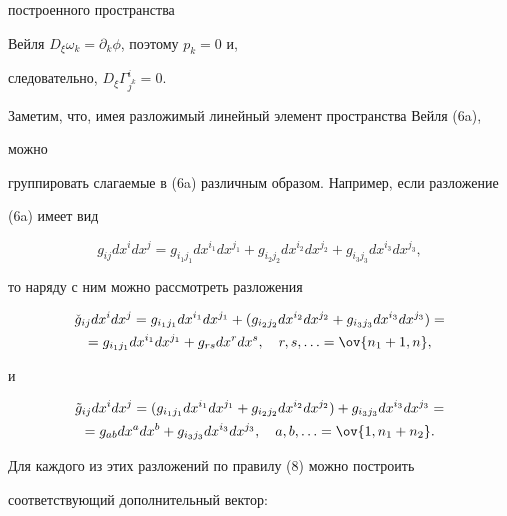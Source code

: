 построенного пространства 


Вейля $D_\xi\omega_k=\partial_k\phi$, поэтому $p_k=0$ и, 


следовательно, $D_\xi\Gamma^i_{j^k}=0$. 


 


Заметим, что, имея разложимый линейный элемент пространства Вейля (6a), 


можно 


группировать слагаемые в (6a) различным образом. Например, если разложение 


(6a) имеет вид 


$$ 


g_{ij}dx^i dx^j=g_{i_1j_1}dx^{i_1}dx^{j_1}+ 


g_{i_2j_2}dx^{i_2}dx^{j_2}+ 


g_{i_3j_3}dx^{i_3}dx^{j_3}, 


$$ 


то наряду с ним можно рассмотреть разложения 


\begin{multline*} 


\Check g_{ij}dx^i dx^j=g_{i_1j_1} 


dx^{i_1}dx^{j_1}+(g_{i_2j_2}dx^{i_2}dx^{j_2}+ 


g_{i_3j_3}dx^{i_3}dx^{j_3})= \\


=g_{i_1j_1} dx^{i_1}dx^{j_1}+g_{r s}dx^r dx^s,\quad 


r,s,\dotsc=\ov{n_1+1,n},


\end{multline*}  


и 


\begin{multline*} 


\Tilde g_{ij}dx^i 


dx^j=(g_{i_1j_1}dx^{i_1}dx^{j_1}+g_{i_2j_2}dx^{i_2}dx^{j_2})+ 


g_{i_3j_3}dx^{i_3}dx^{j_3}=\\


=g_{a b}dx ^a dx^b+ 


g_{i_3j_3}dx^{i_3}dx^{j_3},\quad 


a,b,\dotsc=\ov{1, n_1+n_2}. 


\end{multline*} 


Для каждого из этих разложений по правилу (8) можно построить 


соответствующий дополнительный вектор: 


